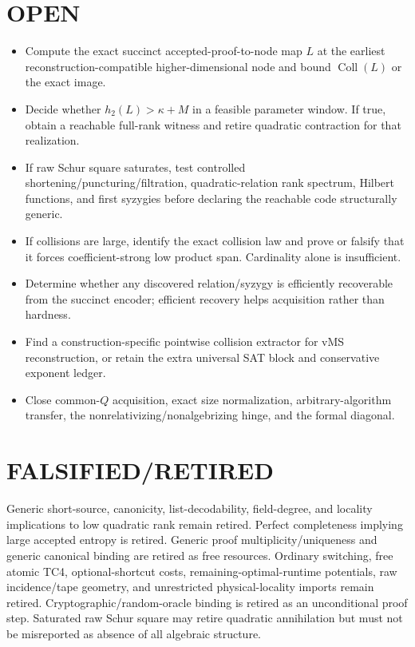 \documentclass[11pt]{article}
\begin{document}
\section*{OPEN}
\begin{itemize}
\item Compute the exact succinct accepted-proof-to-node map \(L\) at the earliest reconstruction-compatible higher-dimensional node and bound \(\operatorname{Coll}(L)\) or the exact image.
\item Decide whether \(h_2(L)>\kappa+M\) in a feasible parameter window. If true, obtain a reachable full-rank witness and retire quadratic contraction for that realization.
\item If raw Schur square saturates, test controlled shortening/puncturing/filtration, quadratic-relation rank spectrum, Hilbert functions, and first syzygies before declaring the reachable code structurally generic.
\item If collisions are large, identify the exact collision law and prove or falsify that it forces coefficient-strong low product span. Cardinality alone is insufficient.
\item Determine whether any discovered relation/syzygy is efficiently recoverable from the succinct encoder; efficient recovery helps acquisition rather than hardness.
\item Find a construction-specific pointwise collision extractor for vMS reconstruction, or retain the extra universal SAT block and conservative exponent ledger.
\item Close common-\(Q\) acquisition, exact size normalization, arbitrary-algorithm transfer, the nonrelativizing/nonalgebrizing hinge, and the formal diagonal.
\end{itemize}

\section*{FALSIFIED/RETIRED}
Generic short-source, canonicity, list-decodability, field-degree, and locality implications to low quadratic rank remain retired. Perfect completeness implying large accepted entropy is retired. Generic proof multiplicity/uniqueness and generic canonical binding are retired as free resources. Ordinary switching, free atomic TC4, optional-shortcut costs, remaining-optimal-runtime potentials, raw incidence/tape geometry, and unrestricted physical-locality imports remain retired. Cryptographic/random-oracle binding is retired as an unconditional proof step. Saturated raw Schur square may retire quadratic annihilation but must not be misreported as absence of all algebraic structure.
\end{document}
